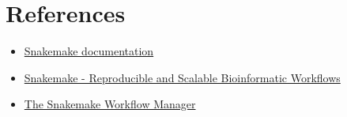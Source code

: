 \documentclass[10pt]{article}
\begin{document}
\section{References}
\begin{itemize}
\item[\faExternalLink] \href{https://snakemake.readthedocs.io/}{Snakemake documentation}
\item[\faExternalLink] \href{https://www.youtube.com/watch?v=9HxTURMP_Uc}{Snakemake - Reproducible and Scalable Bioinformatic Workflows}
\item[\faExternalLink] \href{https://www.chpc.utah.edu/presentations/snakemake/workflows_with_snakemake.pdf}{The Snakemake Workflow Manager}
\end{itemize}
\end{document}

